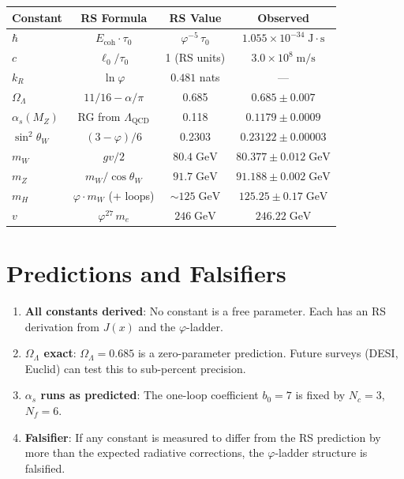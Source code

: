 \documentclass[12pt,a4paper]{article}
\theoremstyle{definition}
\theoremstyle{remark}
\begin{document}
\begin{center}
\renewcommand{\arraystretch}{1.3}
\begin{tabular}{lccc}
\hline
\textbf{Constant} & \textbf{RS Formula} &
\textbf{RS Value} & \textbf{Observed} \\
\hline
$\hbar$ & $E_{\mathrm{coh}} \cdot \tau_0$ &
$\varphi^{-5}\,\tau_0$ &
$1.055 \times 10^{-34}\;\mathrm{J{\cdot}s}$ \\
$c$ & $\ell_0/\tau_0$ & 1 (RS units) &
$3.0 \times 10^8\;\mathrm{m/s}$ \\
$k_R$ & $\ln\varphi$ & $0.481$ nats & --- \\
$\Omega_\Lambda$ & $11/16 - \alpha/\pi$ & 0.685 &
$0.685 \pm 0.007$ \\
$\alpha_s(M_Z)$ & RG from $\Lambda_{\mathrm{QCD}}$ &
0.118 & $0.1179 \pm 0.0009$ \\
$\sin^2\theta_W$ & $(3 - \varphi)/6$ & 0.2303 &
$0.23122 \pm 0.00003$ \\
$m_W$ & $gv/2$ & $80.4\;\mathrm{GeV}$ &
$80.377 \pm 0.012\;\mathrm{GeV}$ \\
$m_Z$ & $m_W/\cos\theta_W$ & $91.7\;\mathrm{GeV}$ &
$91.188 \pm 0.002\;\mathrm{GeV}$ \\
$m_H$ & $\varphi \cdot m_W$ (+ loops) &
$\sim 125\;\mathrm{GeV}$ &
$125.25 \pm 0.17\;\mathrm{GeV}$ \\
$v$ & $\varphi^{27}\,m_e$ & $246\;\mathrm{GeV}$ &
$246.22\;\mathrm{GeV}$ \\
\hline
\end{tabular}
\end{center}

\section{Predictions and Falsifiers}
\label{sec:predictions}

\begin{enumerate}
  \item \textbf{All constants derived}: No constant is a free
  parameter.  Each has an RS derivation from $J(x)$ and the
  $\varphi$-ladder.

  \item \textbf{$\Omega_\Lambda$ exact}:
  $\Omega_\Lambda = 0.685$ is a zero-parameter prediction.
  Future surveys (DESI, Euclid) can test this to sub-percent
  precision.

  \item \textbf{$\alpha_s$ runs as predicted}: The one-loop
  coefficient $b_0 = 7$ is fixed by $N_c = 3$, $N_f = 6$.

  \item \textbf{Falsifier}: If any constant is measured to
  differ from the RS prediction by more than the expected
  radiative corrections, the $\varphi$-ladder structure is
  falsified.
\end{enumerate}
\end{document}
